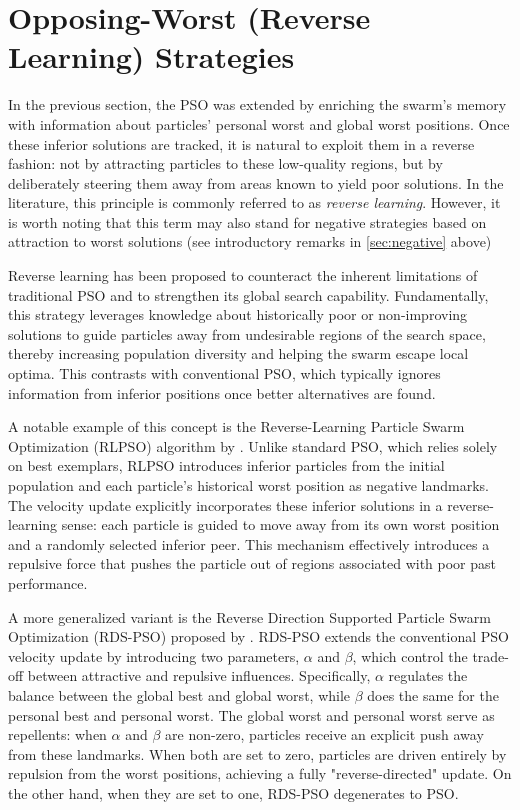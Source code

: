 {\section{Opposing-Worst (Reverse Learning) Strategies}\label{sec:reverse-learning}


In the previous section, the PSO was extended by enriching the swarm’s memory with information about particles' personal worst and global worst positions. Once these inferior solutions are tracked, it is natural to exploit them in a reverse fashion: not by attracting particles to these low-quality regions, but by deliberately steering them away from areas known to yield poor solutions.
In the literature, this principle is commonly referred to as \textit{reverse learning}.  However, it is worth noting that this term may also stand for negative strategies based on attraction to worst solutions (see introductory remarks in \autoref{sec:negative} above)

Reverse learning has been proposed to counteract the inherent limitations of traditional PSO and to strengthen its global search capability. Fundamentally, this strategy leverages knowledge about historically poor or non-improving solutions to guide particles away from undesirable regions of the search space, thereby increasing population diversity and helping the swarm escape local optima. This contrasts with conventional PSO, which typically ignores information from inferior positions once better alternatives are found.

A notable example of this concept is the Reverse-Learning Particle Swarm Optimization (RLPSO) algorithm by \citet{xia2014reverselearning}. Unlike standard PSO, which relies solely on best exemplars, RLPSO introduces inferior particles from the initial population and each particle’s historical worst position as negative landmarks. The velocity update explicitly incorporates these inferior solutions in a reverse-learning sense: each particle is guided to move away from its own worst position and a randomly selected inferior peer. This mechanism effectively introduces a repulsive force that pushes the particle out of regions associated with poor past performance.

A more generalized variant is the Reverse Direction Supported Particle Swarm Optimization (RDS-PSO) proposed by \citet{comak2016generalized}. RDS-PSO extends the conventional PSO velocity update by introducing two parameters, $\alpha$ and $\beta$, which control the trade-off between attractive and repulsive influences. Specifically, $\alpha$ regulates the balance between the global best and global worst, while $\beta$ does the same for the personal best and personal worst. The global worst and personal worst serve as repellents: when $\alpha$ and $\beta$ are non-zero, particles receive an explicit push away from these landmarks. When both are set to zero, particles are driven entirely by repulsion from the worst positions, achieving a fully "reverse-directed" update. On the other hand, when they are set to one, RDS-PSO degenerates to PSO.

}
